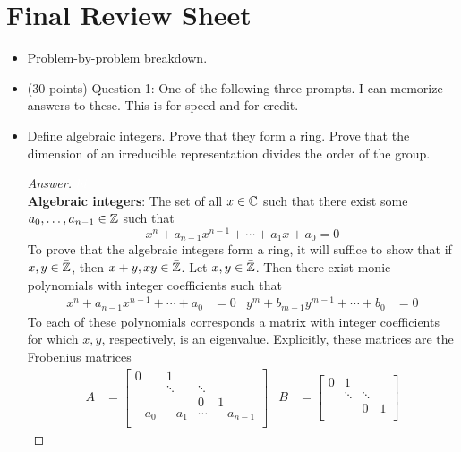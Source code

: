 \documentclass[../notes.tex]{subfiles}
\begin{document}
\section{Final Review Sheet}
\begin{itemize}
    \item {}Problem-by-problem breakdown.
    \item (30 points) Question 1: One of the following three prompts. I can memorize answers to these. This is for speed and for credit.
    \item Define algebraic integers. Prove that they form a ring. Prove that the dimension of an irreducible representation divides the order of the group.
    \begin{proof}[Answer]
        ${\color{white}hi}$\\
        \textbf{Algebraic integers}: The set of all $x\in\mathbb{C}$ such that there exist some $a_0,\dots,a_{n-1}\in\mathbb{Z}$ such that
        \begin{equation*}
            x^n+a_{n-1}x^{n-1}+\cdots+a_1x+a_0 = 0
        \end{equation*}
        To prove that the algebraic integers form a ring, it will suffice to show that if $x,y\in\bar{\mathbb{Z}}$, then $x+y,xy\in\bar{\mathbb{Z}}$. Let $x,y\in\bar{\mathbb{Z}}$. Then there exist monic polynomials with integer coefficients such that
        \begin{align*}
            x^n+a_{n-1}x^{n-1}+\cdots+a_0 &= 0&
            y^m+b_{m-1}y^{m-1}+\cdots+b_0 &= 0
        \end{align*}
        To each of these polynomials corresponds a matrix with integer coefficients for which $x,y$, respectively, is an eigenvalue. Explicitly, these matrices are the Frobenius matrices
        \begin{align*}
            A &=
            \begin{bmatrix}
                0 & 1 &  & \\
                 & \ddots & \ddots & \\
                 &  & 0 & 1\\
                -a_0 & -a_1 & \cdots & -a_{n-1}\\
            \end{bmatrix}&
            B &=
            \begin{bmatrix}
                0 & 1 &  & \\
                 & \ddots & \ddots & \\
                 &  & 0 & 1\\

\end{bmatrix}
\end{align*}
\end{proof}
\end{itemize}
\end{document}
